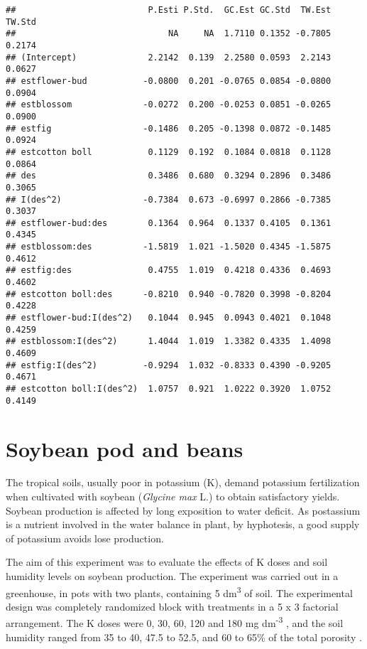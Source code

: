 \documentclass[9pt,a5paper,]{book}
\theoremstyle{definition}
\theoremstyle{definition}
\theoremstyle{remark}
\begin{document}
\begin{verbatim}
##                          P.Esti P.Std.  GC.Est GC.Std  TW.Est TW.Std
##                              NA     NA  1.7110 0.1352 -0.7805 0.2174
## (Intercept)              2.2142  0.139  2.2580 0.0593  2.2143 0.0627
## estflower-bud           -0.0800  0.201 -0.0765 0.0854 -0.0800 0.0904
## estblossom              -0.0272  0.200 -0.0253 0.0851 -0.0265 0.0900
## estfig                  -0.1486  0.205 -0.1398 0.0872 -0.1485 0.0924
## estcotton boll           0.1129  0.192  0.1084 0.0818  0.1128 0.0864
## des                      0.3486  0.680  0.3294 0.2896  0.3486 0.3065
## I(des^2)                -0.7384  0.673 -0.6997 0.2866 -0.7385 0.3037
## estflower-bud:des        0.1364  0.964  0.1337 0.4105  0.1361 0.4345
## estblossom:des          -1.5819  1.021 -1.5020 0.4345 -1.5875 0.4612
## estfig:des               0.4755  1.019  0.4218 0.4336  0.4693 0.4602
## estcotton boll:des      -0.8210  0.940 -0.7820 0.3998 -0.8204 0.4228
## estflower-bud:I(des^2)   0.1044  0.945  0.0943 0.4021  0.1048 0.4259
## estblossom:I(des^2)      1.4044  1.019  1.3382 0.4335  1.4098 0.4609
## estfig:I(des^2)         -0.9294  1.032 -0.8333 0.4390 -0.9205 0.4671
## estcotton boll:I(des^2)  1.0757  0.921  1.0222 0.3920  1.0752 0.4149
\end{verbatim}

\section{Soybean pod and beans}\label{soybean-pod-and-beans}

The tropical soils, usually poor in potassium (K), demand potassium
fertilization when cultivated with soybean (\emph{Glycine max} L.) to
obtain satisfactory yields. Soybean production is affected by long
exposition to water deficit. As postassium is a nutrient involved in the
water balance in plant, by hyphotesis, a good supply of potassium avoids
lose production.

The aim of this experiment was to evaluate the effects of K doses and
soil humidity levels on soybean production. The experiment was carried
out in a greenhouse, in pots with two plants, containing 5
dm\textsuperscript{3} of soil. The experimental design was completely
randomized block with treatments in a 5 x 3 factorial arrangement. The K
doses were 0, 30, 60, 120 and 180 mg dm\textsuperscript{-3} , and the
soil humidity ranged from 35 to 40, 47.5 to 52.5, and 60 to 65\% of the
total porosity \citep[for more details]{Serafim2012}.
\end{document}
